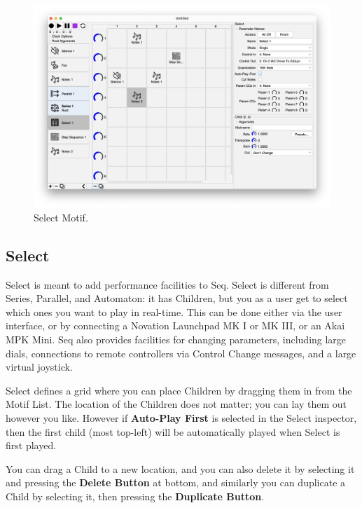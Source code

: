 \documentclass[twoside,10pt]{article}
\begin{document}
\clearpage

\begin{figure}[t]
\centering
\includegraphics[width=6.5in]{Select}
\vspace{-2em}
\caption{Select Motif.}
\label{select}
\end{figure}

\subsection{Select}

Select is meant to add performance facilities to Seq.  Select is different from Series, Parallel, and Automaton: it has Children, but you as a user get to select which ones you want to play in real-time.  This can be done either via the user interface, or by connecting a Novation Launchpad MK I or MK III, or an Akai MPK Mini.  Seq also provides facilities for changing parameters, including large dials, connections to remote controllers via Control Change messages, and a large virtual joystick.

Select defines a grid where you can place Children by dragging them in from the Motif List.  The location of the Children does not matter; you can lay them out however you like.  However if {\bf Auto-Play First} is selected in the Select inspector, then the first child (most top-left) will be automatically played when Select is first played.

You can drag a Child to a new location, and you can also  delete it by selecting it and pressing the {\bf Delete Button} at bottom, and similarly you can duplicate a Child by selecting it, then pressing the {\bf Duplicate Button}. 
\end{document}
